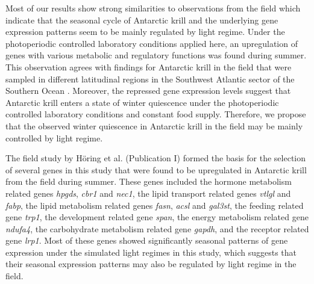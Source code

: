 Most of our results show strong similarities to observations from the field
which indicate that the seasonal cycle of Antarctic krill and the underlying
gene expression patterns seem to be mainly regulated by light regime. Under the
photoperiodic controlled laboratory conditions applied here, an upregulation of
genes with various metabolic and regulatory functions was found during summer.
This observation agrees with findings for Antarctic krill in the field that
were sampled in different latitudinal regions in the Southwest Atlantic sector
of the Southern Ocean \citep[and Publication I]{seear_seasonal_2012}. Moreover,
the repressed gene expression levels suggest that Antarctic krill enters a
state of winter quiescence under the photoperiodic controlled laboratory
conditions and constant food supply. Therefore, we propose that the observed
winter quiescence in Antarctic krill in the field \citep{meyer_seasonal_2010}
may be mainly controlled by light regime.

The field study by Höring et al. (Publication I) formed the basis for the
selection of several genes in this study that were found to be upregulated in
Antarctic krill from the field during summer. These genes included the hormone
metabolism related genes \textit{hpgds}, \textit{cbr1} and \textit{nec1}, the
lipid transport related genes \textit{vtlgl} and \textit{fabp}, the lipid
metabolism related genes \textit{fasn}, \textit{acsl} and \textit{gal3st}, the
feeding related gene \textit{trp1}, the development related gene \textit{span},
the energy metabolism related gene \textit{ndufa4}, the carbohydrate metabolism
related gene \textit{gapdh}, and the receptor related gene \textit{lrp1}. Most
of these genes showed significantly seasonal patterns of gene expression under
the simulated light regimes in this study, which suggests that their seasonal
expression patterns may also be regulated by light regime in the field.

